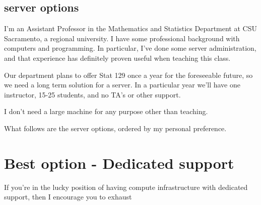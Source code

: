 \documentclass{article}
\begin{document}
\subsection{server options}

I'm an Assistant Professor in the Mathematics and Statistics Department at CSU Sacramento, a regional university.
I have some professional background with computers and programming.
In particular, I've done some server administration, and that experience has definitely proven useful when teaching this class.

Our department plans to offer Stat 129 once a year for the foreseeable future, so we need a long term solution for a server.
In a particular year we'll have one instructor, 15-25 students, and no TA's or other support.

I don't need a large machine for any purpose other than teaching.

What follows are the server options, ordered by my personal preference.

\section{Best option - Dedicated support}

If you're in the lucky position of having compute infrastructure with dedicated support, then I encourage you to exhaust 
\end{document}
